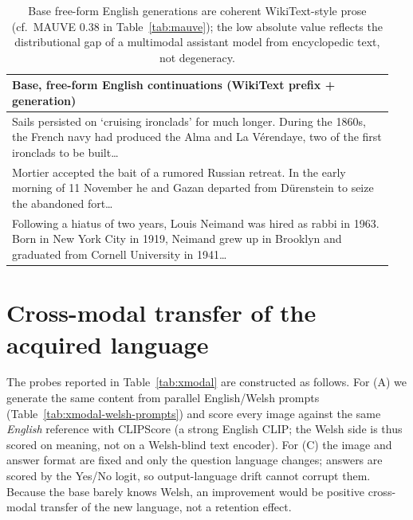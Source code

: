 \begin{table}[h]\centering\footnotesize
\renewcommand{\arraystretch}{1.2}
\begin{tabular}{@{}p{0.95\linewidth}@{}}
\toprule
\textbf{Base, free-form English continuations (WikiText prefix + generation)}\\
\midrule
\footnotesize Sails persisted on `cruising ironclads' for much longer. During the
1860s, the French navy had produced the Alma and La V\'erendaye, two of the first
ironclads to be built\dots\\
\midrule
\footnotesize Mortier accepted the bait of a rumored Russian retreat. In the early
morning of 11 November he and Gazan departed from D\"urenstein to seize the
abandoned fort\dots\\
\midrule
\footnotesize Following a hiatus of two years, Louis Neimand was hired as rabbi in
1963. Born in New York City in 1919, Neimand grew up in Brooklyn and graduated
from Cornell University in 1941\dots\\
\bottomrule
\end{tabular}
\caption{Base free-form English generations are coherent WikiText-style prose
(cf.\ MAUVE $0.38$ in Table~\ref{tab:mauve}); the low absolute value reflects the
distributional gap of a multimodal assistant model from encyclopedic text, not
degeneracy.}
\label{tab:mauve-samples}
\end{table}


\section{Cross-modal transfer of the acquired language}
\label{app:xmodal}
The probes reported in Table~\ref{tab:xmodal} are constructed as follows. For (A)
we generate the same content from parallel English/Welsh prompts
(Table~\ref{tab:xmodal-welsh-prompts}) and score every image against the same
\emph{English} reference with CLIPScore (a strong English CLIP; the Welsh side is
thus scored on meaning, not on a Welsh-blind text encoder). For (C) the image and
answer format are fixed and only the question language changes; answers are
scored by the Yes/No logit, so output-language drift cannot corrupt them. Because
the base barely knows Welsh, an improvement would be positive cross-modal
transfer of the new language, not a retention effect.

